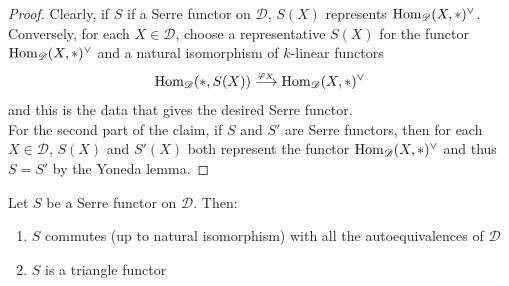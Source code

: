 \begin{proof}
Clearly, if $S$ if a Serre functor on $\mathscr{D}$, $S(X)$ represents $\textnormal{Hom}_{\mathscr{D}}(X,*)^{\vee}$. Conversely, for each $X \in \mathscr{D}$, choose a representative $S(X)$ for the functor $\textnormal{Hom}_{\mathscr{D}}(X,*)^{\vee}$ and a natural isomorphism of $k$-linear functors $$\textnormal{Hom}_{\mathscr{D}}(*,S(X)) \overset{\varphi_X}{\longrightarrow} \textnormal{Hom}_{\mathscr{D}}(X,*)^{\vee}$$
and this is the data that gives the desired Serre functor. \\
For the second part of the claim, if $S$ and $S'$ are Serre functors, then for each $X \in \mathscr{D}$, $S(X)$ and $S'(X)$ both represent the functor $\textnormal{Hom}_{\mathscr{D}}(X,*)^{\vee}$ and thus $S=S'$ by the Yoneda lemma. 
\end{proof}

\begin{prop}
Let $S$ be a Serre functor on $\mathscr{D}$. Then: 
\begin{enumerate}
\item $S$ commutes (up to natural isomorphism) with all the autoequivalences of $\mathscr{D}$
\item $S$ is a triangle functor 
\end{enumerate}   
\end{prop}

